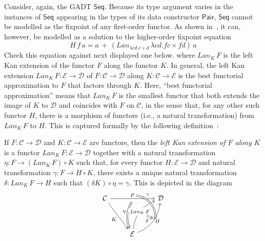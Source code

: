 \documentclass[acmsmall,screen,review,anonymous]{acmart}
\theoremstyle{definition}
\newcommand{\cal}{\mathcal}
\begin{document}
Consider, again, the GADT $\mathsf{Seq}$. Because its type argument
varies in the instances of $\mathsf{Seq}$ appearing in the types of
its data constructor $\mathsf{Pair}$, $\mathsf{Seq}$ cannot be
modelled as the fixpoint of any first-order functor. As shown
in~\cite{jp19}, it can, however, be modelled as a solution to the
higher-order fixpoint equation
\[H\,f\,a = a \,+\,(Lan_{\lambda c d. c \times d}\, \lambda
c d. f c \times f d)\,a\]
{\color{red} Check this equation against next displayed one below.}
where $Lan_K \,F$ is the left Kan extension of
the functor $F$ along the functor $K$. In general, the left Kan
extension $Lan_K \,F : {\cal E} \to {\cal D}$ of $F : {\cal C} \to
{\cal D}$ along $K : {\cal C} \to {\cal E}$ is the best functorial
approximation to $F$ that factors through $K$. Here, ``best functorial
approximation'' means that $Lan_K \,F$ is the smallest functor that
both extends the image of $K$ to $\cal D$ and coincides with $F$ on
$\cal C$, in the sense that, for any other such functor $H$, there is
a morphism of functors (i.e., a natural transformation) from $Lan_K
\,F$ to $H$. This is captured formally by the following
definition~\cite{mac71}:
\begin{definition}\label{def:lke}
If $F : {\cal C} \to {\cal D}$ and $K : {\cal C} \to {\cal E}$ are
functors, then the {\em left Kan extension of $F$ along $K$} is a
functor $\mathit{Lan}_K\,F : {\cal E} \to {\cal D}$ together with a
natural transformation $\eta : F \to (\mathit{Lan}_K\,F) \circ K$ such
that, for every functor $H : {\cal E} \to {\cal D}$ and natural
transformation $\gamma : F \to H \circ K$, there exists a unique
natural transformation $\delta : \mathit{Lan}_K\,F \to H$ such that
$(\delta K) \circ \eta = \gamma$. This is depicted in the diagram
\[\begin{tikzcd}[row sep = huge]
{\cal C}
\ar[rr, "{F}"{name=Fa, above}, ""{name=F, below}]
\ar[rd, "{K}"']
&& {\cal D} \\
& {\cal E}
\ar[Rightarrow, bend right = 25, from=F, "{\eta}"']
\ar[ur, bend left, "{\mathit{Lan}_{K}\,F}"{name=Lan, description}]
\ar[ur, bend right, "{H}"'{name=L, right}, ""'{name=Lr, right}]
\ar[Rightarrow, bend left = 45, from=Fa, to=Lr, "{\gamma}" near start]
\ar[Rightarrow, dashed, from=Lan, to=L, "{\delta}"']
\end{tikzcd}\]
\end{definition}
\end{document}
